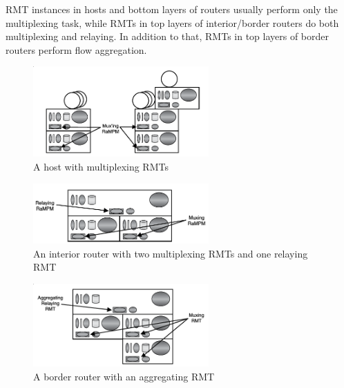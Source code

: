             RMT instances in hosts and bottom layers of routers usually perform only the multiplexing task, while RMTs in top layers of interior/border routers do both multiplexing and relaying. In addition to that, RMTs in top layers of border routers perform flow aggregation.

            \begin{figure}[H]
                \begin{center}
                    \includegraphics[width=0.6\textwidth]{fig/fwding_rmt-mux.png}
                  \caption{A host with multiplexing RMTs}
                  \label{fig:rmt2}
                \end{center}
            \end{figure}
            \begin{figure}[H]
                \begin{center}
                    \includegraphics[width=0.6\textwidth]{fig/fwding_rmt-relay.png}
                  \caption{An interior router with two multiplexing RMTs and one relaying RMT}
                  \label{fig:rmt3}
                \end{center}
            \end{figure}
            \begin{figure}[H]
                \begin{center}
                    \includegraphics[width=0.6\textwidth]{fig/fwding_rmt-agg.png}
                  \caption{A border router with an aggregating RMT}
                  \label{fig:rmt4}
                \end{center}
            \end{figure}


